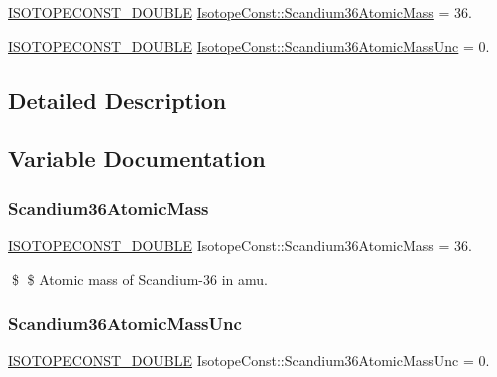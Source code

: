 \begin{DoxyCompactItemize}
\item 
\mbox{\hyperlink{group___isotope_const-_macros_ga8f45a7272ce02c0b4c65c44636ed719a}{I\+S\+O\+T\+O\+P\+E\+C\+O\+N\+S\+T\+\_\+\+D\+O\+U\+B\+LE}} \mbox{\hyperlink{group___isotope_const-_scandium-_sc36_ga8bdeab673ec02238890c46c94638e0f8}{Isotope\+Const\+::\+Scandium36\+Atomic\+Mass}} = 36.
\item 
\mbox{\hyperlink{group___isotope_const-_macros_ga8f45a7272ce02c0b4c65c44636ed719a}{I\+S\+O\+T\+O\+P\+E\+C\+O\+N\+S\+T\+\_\+\+D\+O\+U\+B\+LE}} \mbox{\hyperlink{group___isotope_const-_scandium-_sc36_gaff9870b2a629d461d304d2d582cb5a6a}{Isotope\+Const\+::\+Scandium36\+Atomic\+Mass\+Unc}} = 0.
\end{DoxyCompactItemize}


\subsection{Detailed Description}


\subsection{Variable Documentation}
\mbox{\label{group___isotope_const-_scandium-_sc36_ga8bdeab673ec02238890c46c94638e0f8}} 
\subsubsection{\texorpdfstring{Scandium36\+Atomic\+Mass}{Scandium36AtomicMass}}
{\footnotesize\ttfamily \mbox{\hyperlink{group___isotope_const-_macros_ga8f45a7272ce02c0b4c65c44636ed719a}{I\+S\+O\+T\+O\+P\+E\+C\+O\+N\+S\+T\+\_\+\+D\+O\+U\+B\+LE}} Isotope\+Const\+::\+Scandium36\+Atomic\+Mass = 36.}

\$ \$ Atomic mass of Scandium-\/36 in amu. \mbox{\label{group___isotope_const-_scandium-_sc36_gaff9870b2a629d461d304d2d582cb5a6a}} 
\subsubsection{\texorpdfstring{Scandium36\+Atomic\+Mass\+Unc}{Scandium36AtomicMassUnc}}
{\footnotesize\ttfamily \mbox{\hyperlink{group___isotope_const-_macros_ga8f45a7272ce02c0b4c65c44636ed719a}{I\+S\+O\+T\+O\+P\+E\+C\+O\+N\+S\+T\+\_\+\+D\+O\+U\+B\+LE}} Isotope\+Const\+::\+Scandium36\+Atomic\+Mass\+Unc = 0.}


